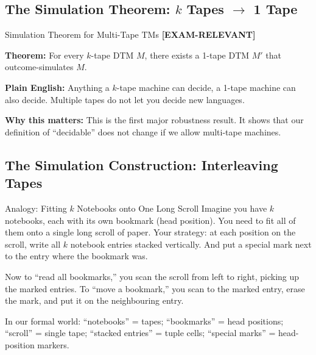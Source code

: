 \documentclass[11pt,a4paper]{article}
\newcommand{\kemark}{\textcolor{red!70!black}{\textbf{[EXAM-RELEVANT]}}}
\begin{document}
\subsection{The Simulation Theorem: $k$ Tapes $\to$ 1 Tape}

\begin{conceptbox}{Simulation Theorem for Multi-Tape TMs \kemark}

\textbf{Theorem:} For every $k$-tape DTM $M$, there exists a 1-tape DTM $M'$ that outcome-simulates $M$.

\textbf{Plain English:} Anything a $k$-tape machine can decide, a 1-tape machine can also decide. Multiple tapes do not let you decide new languages.

\textbf{Why this matters:} This is the first major robustness result. It shows that our definition of ``decidable'' does not change if we allow multi-tape machines.
\end{conceptbox}

\subsection{The Simulation Construction: Interleaving Tapes}

\begin{notebox}{Analogy: Fitting $k$ Notebooks onto One Long Scroll}
Imagine you have $k$ notebooks, each with its own bookmark (head position). You need to fit all of them onto a single long scroll of paper. Your strategy: at each position on the scroll, write all $k$ notebook entries stacked vertically. And put a special mark next to the entry where the bookmark was.

Now to ``read all bookmarks,'' you scan the scroll from left to right, picking up the marked entries. To ``move a bookmark,'' you scan to the marked entry, erase the mark, and put it on the neighbouring entry.

In our formal world: ``notebooks'' = tapes; ``bookmarks'' = head positions; ``scroll'' = single tape; ``stacked entries'' = tuple cells; ``special marks'' = head-position markers.
\end{notebox}
\end{document}
